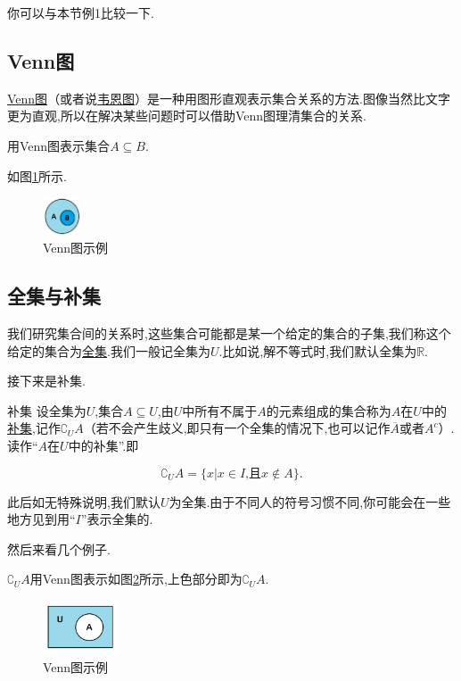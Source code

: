 \documentclass[lang=cn,math=cm,chinesefont=nofont,11pt,scheme=chinese,twocol]{elegantbook}
\begin{document}
\begin{remark}
  你可以与本节例1比较一下.
\end{remark}

\subsection{Venn图}
  \underline{Venn图}（或者说\underline{韦恩图}）是一种用图形直观表示集合关系的方法.图像当然比文字更为直观,所以在解决某些问题时可以借助Venn图理清集合的关系.

\begin{example}
  用Venn图表示集合$A\subseteq B$.
\end{example}
\begin{solution}
  如图\ref{img:Venn1}所示.
\end{solution}
\begin{figure}[h]
  \centering
  \includegraphics[width=0.1\textwidth]{image/Venn1.png}
  \caption{Venn图示例}
  \label{img:Venn1}
\end{figure}

\subsection{全集与补集}
  我们研究集合间的关系时,这些集合可能都是某一个给定的集合的子集,我们称这个给定的集合为\underline{全集}.我们一般记全集为$U$.比如说,解不等式时,我们默认全集为$\mathbb{R}$.

  接下来是补集.
\begin{definition}{补集}
  设全集为$U$,集合$A\subseteq U$,由$U$中所有不属于$A$的元素组成的集合称为$A$在$U$中的\underline{补集},记作${\complement}_{U}A$（若不会产生歧义,即只有一个全集的情况下,也可以记作$\overline{A}$或者$A^c$）.读作“$A$在$U$中的补集”.即

  $${\complement}_{U}A=\{x|x\in I\text{,且}x\notin A\}.$$
\end{definition}
\begin{remark}
  此后如无特殊说明,我们默认$U$为全集.由于不同人的符号习惯不同,你可能会在一些地方见到用“$I$”表示全集的.
\end{remark}
  然后来看几个例子.
\begin{example}
  $\complement_{U}A$用Venn图表示如图\ref{img:Venn3}所示,上色部分即为$\complement_{U}A$.
\end{example}
\begin{figure}[h]
  \centering
  \includegraphics[width=0.2\textwidth]{image/Venn3.png}
  \caption{Venn图示例}
  \label{img:Venn3}
\end{figure}
\end{document}
